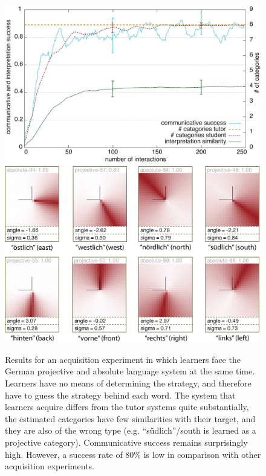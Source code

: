 \begin{figure} 
\begin{center}
\includegraphics[width=0.8\columnwidth]{figs/category-acquisition-projective+absolute-results+categories-1}
\includegraphics[width=0.8\columnwidth]{figs/category-acquisition-projective+absolute-results+categories-2.png}
\end{center}
\caption[Results for acquisition of projective and absolute systems]{
Results for an acquisition experiment in which learners face 
the German projective and absolute language system at the same time. 
Learners have no means of determining the strategy, and therefore have 
to guess the strategy behind each word. The system that learners 
acquire differs from the tutor systems quite substantially, the estimated 
categories have few similarities with their target, and they are 
also of the wrong type (e.g. ``s\"udlich''/south is learned as a projective category).
Communicative success remains surprisingly high. 
However, a success rate of 80\% is low in comparison with other acquisition experiments.}
\label{f:category-acquisition-projective+absolute-results}
\end{figure}


